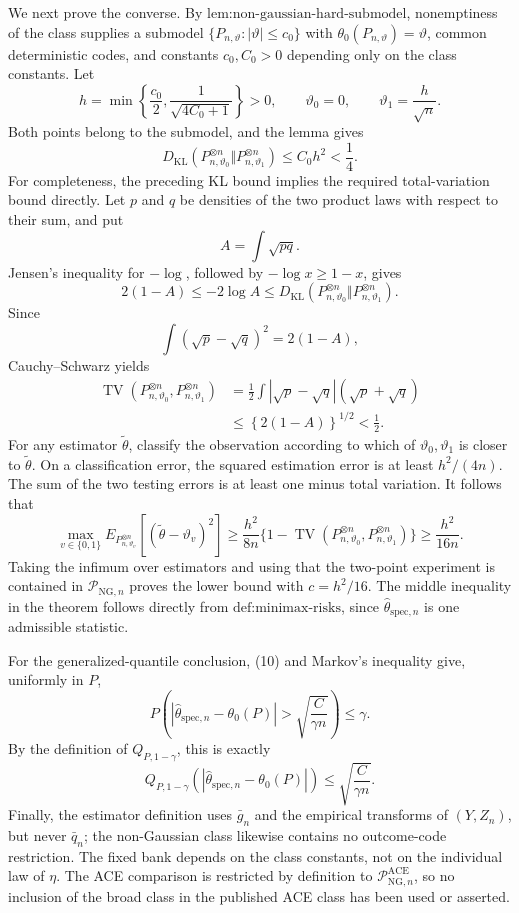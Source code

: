 We next prove the converse.  By \(\text{lem:non-gaussian-hard-submodel}\), nonemptiness of the class supplies a submodel
\(\{P_{n,\vartheta}:|\vartheta|\le c_0\}\) with
\(\theta_0(P_{n,\vartheta})=\vartheta\), common deterministic codes, and constants
\(c_0,C_0>0\) depending only on the class constants.  Let
\[
 h=\min\left\{\frac{c_0}{2},\frac{1}{\sqrt{4C_0+1}}\right\}>0,
 \qquad
 \vartheta_0=0,
 \qquad
 \vartheta_1=\frac h{\sqrt n}.
\]
Both points belong to the submodel, and the lemma gives
\[
 D_{\mathrm{KL}}(P_{n,\vartheta_0}^{\otimes n}\Vert
                  P_{n,\vartheta_1}^{\otimes n})
 \le C_0h^2<\frac14.
\]
For completeness, the preceding KL bound implies the required total-variation bound directly.  Let \(p\) and \(q\) be densities of the two product laws with respect to their sum, and put
\[
 A=\int\sqrt{pq}.
\]
Jensen's inequality for \(-\log\), followed by \(-\log x\ge1-x\), gives
\[
 2(1-A)\le-2\log A
 \le D_{\mathrm{KL}}(P_{n,\vartheta_0}^{\otimes n}\Vert
                     P_{n,\vartheta_1}^{\otimes n}).
\]
Since
\[
 \int(\sqrt p-\sqrt q)^2=2(1-A),
\]
Cauchy--Schwarz yields
\[
\begin{aligned}
 \operatorname{TV}(P_{n,\vartheta_0}^{\otimes n},
                    P_{n,\vartheta_1}^{\otimes n})
 &=\frac12\int|\sqrt p-\sqrt q|(\sqrt p+\sqrt q)\\
 &\le\left\{2(1-A)\right\}^{1/2}
 <\frac12.
\end{aligned}
\]
For any estimator \(\widetilde\theta\), classify the observation according to which of \(\vartheta_0,\vartheta_1\) is closer to \(\widetilde\theta\).  On a classification error, the squared estimation error is at least
\(h^2/(4n)\).  The sum of the two testing errors is at least one minus total variation.  It follows that
\[
 \max_{v\in\{0,1\}}
 E_{P_{n,\vartheta_v}^{\otimes n}}
 [ (\widetilde\theta-\vartheta_v)^2]
 \ge\frac{h^2}{8n}
       \{1-\operatorname{TV}(P_{n,\vartheta_0}^{\otimes n},
                              P_{n,\vartheta_1}^{\otimes n})\}
 \ge\frac{h^2}{16n}. \tag{11}
\]
Taking the infimum over estimators and using that the two-point experiment is contained in
\(\mathcal P_{\mathrm{NG},n}\) proves the lower bound with \(c=h^2/16\).  The middle inequality in the theorem follows directly from
\(\text{def:minimax-risks}\), since \(\widehat\theta_{\mathrm{spec},n}\) is one admissible statistic.

For the generalized-quantile conclusion, (10) and Markov's inequality give, uniformly in \(P\),
\[
 P\!\left(
 |\widehat\theta_{\mathrm{spec},n}-\theta_0(P)|
 >\sqrt{\frac{C}{\gamma n}}
 \right)
 \le\gamma.
\]
By the definition of \(Q_{P,1-\gamma}\), this is exactly
\[
 Q_{P,1-\gamma}
 (|\widehat\theta_{\mathrm{spec},n}-\theta_0(P)|)
 \le\sqrt{\frac{C}{\gamma n}}.
\]
Finally, the estimator definition uses \(\bar g_n\) and the empirical transforms of \((Y,Z_n)\), but never \(\bar q_n\); the non-Gaussian class likewise contains no outcome-code restriction.  The fixed bank depends on the class constants, not on the individual law of \(\eta\).  The ACE comparison is restricted by definition to
\(\mathcal P_{\mathrm{NG},n}^{\mathrm{ACE}}\), so no inclusion of the broad class in the published ACE class has been used or asserted.